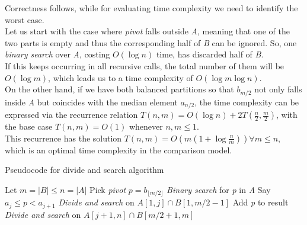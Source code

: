 Correctness follows, while for evaluating time complexity we need to identify the worst case. \\
Let us start with the case where \textit{pivot} falls outside \textit{A}, meaning that one of the two parts is empty and thus the corresponding half of \textit{B} can be ignored. So, one \textit{binary search}  over \textit{A}, costing $O(\log n)$ time, has discarded half of \textit{B}.\\
If this keeps occurring in all recursive calls, the total number of them will be $O(\log m)$, which leads us to a time complexity of $O(\log m \log n)$.\\
On the other hand, if we have both balanced partitions so that $b_{m/2}$ not only falls inside \textit{A} but coincides with the median element $a_{n/2}$, the time complexity can be expressed via the recurrence relation $T(n, m) = O(\log n) + 2T(\frac{n}{2}, \frac{m}{2})$, with the base case $T(n,m)=O(1)$ whenever $n,m \leq 1$.\\
This recurrence has the solution $T(n,m)=O(m(1+\log \frac{n}{m})) \forall m \leq n$, which is an optimal time complexity in the comparison model.

\begin{algorithm}
    \captionsetup{labelsep=newline}
    \caption{Pseudocode for divide and search algorithm \label{alg:divandsearch}}
    \begin{algorithmic}[1]
        \State Let $m=|B| \leq n=|A|$
        \State Pick \textit{pivot} $p=b_{\lfloor m/2 \rfloor}$
        \State \textit{Binary search} for \textit{p} in \textit{A} \Comment Say $a_j \leq p < a_{j+1}$
        \State \textit{Divide and search} on $A[1, j] \cap B[1, m/2 - 1]$
            \State Add \textit{p} to result
        \EndIf
        \State \textit{Divide and search} on $A[ j + 1, n] \cap B[m/2 + 1, m]$
    \end{algorithmic}
\end{algorithm}